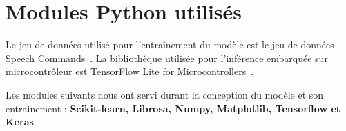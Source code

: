 \documentclass[a4paper,12pt,twoside]{report}
\theoremstyle{definition}
\theoremstyle{plain}
\theoremstyle{remark}
\begin{document}
\appendix
\chapter{Modules Python utilisés}
Le jeu de données utilisé pour l'entraînement du modèle est le jeu de données Speech Commands~\cite{kaggle_speech_commands}. La bibliothèque utilisée pour l'inférence embarquée sur microcontrôleur est TensorFlow Lite for Microcontrollers~\cite{tflite_micro_github}.

Les modules suivants nous ont servi durant la conception du modèle et son entrainement : \textbf{Scikit-learn, Librosa, Numpy, Matplotlib, Tensorflow et Keras}.




\end{document}
